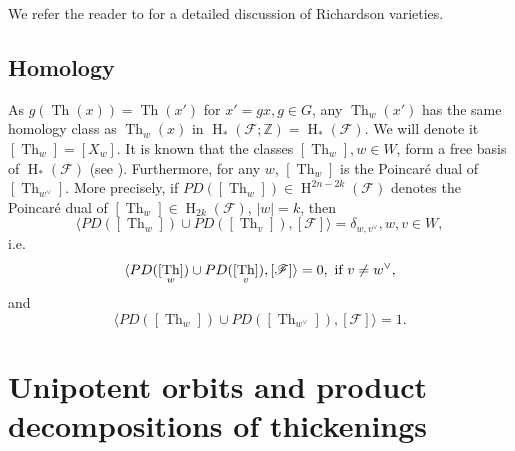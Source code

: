 \documentclass[12pt]{amsbook}%
\theoremstyle{definition}
\theoremstyle{remark}
\numberwithin{section}{chapter}
\numberwithin{subsection}{section}
\numberwithin{figure}{chapter}
\DeclareMathOperator{\Th}{Th}
\DeclareMathOperator{\coh}{H}
\def\simod{\sigma_{mod}}
\def\bZ{{\mathbb{Z}}}
\def\cF{{\mathscr{F}}}
\def\cX{{\mathscr{X}}}
\begin{document}
{{We refer the reader to  \cite{speyer2024richardsonvarietiesprojectedrichardson} for  a detailed discussion of Richardson varieties. 


\subsection{Homology}\label{sec:homology}


As $g(\Th(x))=\Th(x')$ for $x'=gx, g\in G$, any 
$\Th_w(x')$ has the same homology class as $\Th_w(x)$ in 
$\coh_*(\cF; \bZ)= \coh_*(\cF)$. We will denote it $[\Th_w]=[X_w]$. It is known that the classes $[\Th_w], w\in W$, form a free basis of $\operatorname{H}_*(\cF)$ (see \cite{BGG73}).
Furthermore, for any $w$, $[\Th_w]$ is the Poincar\'e dual of $[\Th_{w^\vee}]$. More precisely, if 
$PD([\Th_w])\in \coh^{2n-2k}(\cF)$ denotes the Poincar\'e dual of $[\Th_w]\in \coh_{2k}(\cF)$, $|w|=k$, 
then 
$$
\langle PD([\Th_w]) \cup PD([\Th_v]), [\cF]\rangle = \delta_{w, v^\vee}, w, v\in W,
$$
i.e. 
$$
\langle PD([\Th_w]) \cup PD([\Th_v]), [\cF]\rangle = 0, \hbox{\ if\ } v\ne  w^\vee,
$$
and 
$$
\langle PD([\Th_w]) \cup PD([\Th_{w^\vee}]), [\cF]\rangle = 1. 
$$



\section{Unipotent orbits and product decompositions of thickenings}
\label{section_lie_alg}


}}
\end{document}

